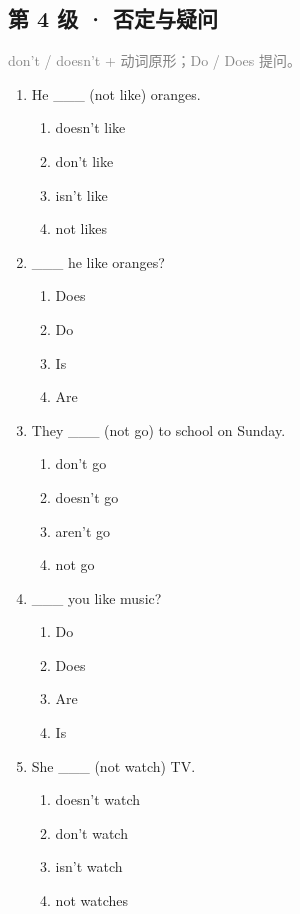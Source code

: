 \documentclass[11pt,a4paper]{ctexart}
\begin{document}
\subsection*{第 4 级 · 否定与疑问}
\noindent\textcolor{gray}{don’t / doesn’t + 动词原形；Do / Does 提问。}\par\smallskip
\begin{enumerate}[leftmargin=*,itemsep=4pt]
\item He \_\_\_ (not like) oranges.
\begin{enumerate}[label=\Alph*.,leftmargin=2em,itemsep=1pt,topsep=2pt]
\item doesn’t like
\item don’t like
\item isn’t like
\item not likes
\end{enumerate}
\item \_\_\_ he like oranges?
\begin{enumerate}[label=\Alph*.,leftmargin=2em,itemsep=1pt,topsep=2pt]
\item Does
\item Do
\item Is
\item Are
\end{enumerate}
\item They \_\_\_ (not go) to school on Sunday.
\begin{enumerate}[label=\Alph*.,leftmargin=2em,itemsep=1pt,topsep=2pt]
\item don’t go
\item doesn’t go
\item aren’t go
\item not go
\end{enumerate}
\item \_\_\_ you like music?
\begin{enumerate}[label=\Alph*.,leftmargin=2em,itemsep=1pt,topsep=2pt]
\item Do
\item Does
\item Are
\item Is
\end{enumerate}
\item She \_\_\_ (not watch) TV.
\begin{enumerate}[label=\Alph*.,leftmargin=2em,itemsep=1pt,topsep=2pt]
\item doesn’t watch
\item don’t watch
\item isn’t watch
\item not watches

\end{enumerate}
\end{enumerate}
\end{document}
